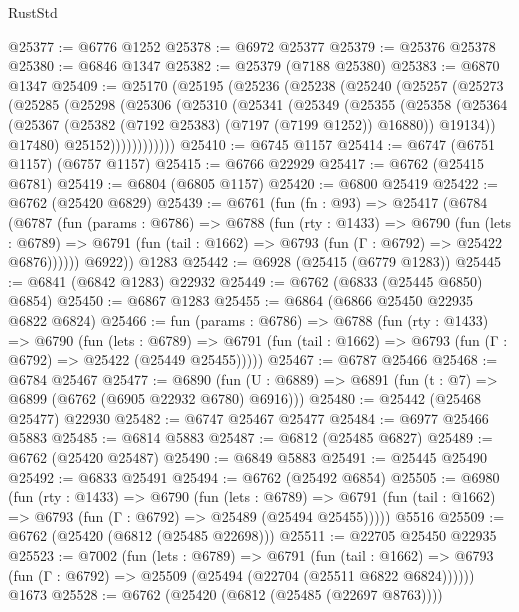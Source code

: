 \begin{lexlean}{RustStd}
\begin{coremodule}
@25377 := @6776 @1252
@25378 := @6972 @25377
@25379 := @25376 @25378
@25380 := @6846 @1347
@25382 := @25379 (@7188 @25380)
@25383 := @6870 @1347
@25409 := @25170
    (@25195
      (@25236
        (@25238
          (@25240
            (@25257
              (@25273
                (@25285
                  (@25298
                    (@25306
                      (@25310
                        (@25341
                          (@25349
                            (@25355
                              (@25358
                                (@25364
                                  (@25367 (@25382 (@7192 @25383) (@7197 (@7199 @1252)) @16880))
                                  @19134))
                              @17480)
                            @25152))))))))))))
@25410 := @6745 @1157
@25414 := @6747 (@6751 @1157) (@6757 @1157)
@25415 := @6766 @22929
@25417 := @6762 (@25415 @6781)
@25419 := @6804 (@6805 @1157)
@25420 := @6800 @25419
@25422 := @6762 (@25420 @6829)
@25439 := @6761
    (fun (fn : @93) =>
    @25417
      (@6784
        (@6787
          (fun (params : @6786) =>
          @6788
            (fun (rty : @1433) =>
            @6790
              (fun (lets : @6789) =>
              @6791 (fun (tail : @1662) => @6793 (fun (Γ : @6792) => @25422 @6876))))))
        @6922))
    @1283
@25442 := @6928 (@25415 (@6779 @1283))
@25445 := @6841 (@6842 @1283) @22932
@25449 := @6762 (@6833 (@25445 @6850) @6854)
@25450 := @6867 @1283
@25455 := @6864 (@6866 @25450 @22935 @6822 @6824)
@25466 := fun (params : @6786) =>
  @6788
    (fun (rty : @1433) =>
    @6790
      (fun (lets : @6789) =>
      @6791 (fun (tail : @1662) => @6793 (fun (Γ : @6792) => @25422 (@25449 @25455)))))
@25467 := @6787 @25466
@25468 := @6784 @25467
@25477 := @6890
    (fun (U : @6889) => @6891 (fun (t : @7) => @6899 (@6762 (@6905 @22932 @6780) @6916)))
@25480 := @25442 (@25468 @25477) @22930
@25482 := @6747 @25467 @25477
@25484 := @6977 @25466 @5883
@25485 := @6814 @5883
@25487 := @6812 (@25485 @6827)
@25489 := @6762 (@25420 @25487)
@25490 := @6849 @5883
@25491 := @25445 @25490
@25492 := @6833 @25491
@25494 := @6762 (@25492 @6854)
@25505 := @6980
    (fun (rty : @1433) =>
    @6790
      (fun (lets : @6789) =>
      @6791 (fun (tail : @1662) => @6793 (fun (Γ : @6792) => @25489 (@25494 @25455)))))
    @5516
@25509 := @6762 (@25420 (@6812 (@25485 @22698)))
@25511 := @22705 @25450 @22935
@25523 := @7002
    (fun (lets : @6789) =>
    @6791
      (fun (tail : @1662) =>
      @6793 (fun (Γ : @6792) => @25509 (@25494 (@22704 (@25511 @6822 @6824))))))
    @1673
@25528 := @6762 (@25420 (@6812 (@25485 (@22697 @8763))))

\end{coremodule}
\end{lexlean}
